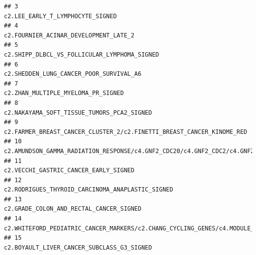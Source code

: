 \documentclass{article}\usepackage[]{graphicx}\usepackage[]{color}
\makeatletter
\newenvironment{kframe}{%
 \def\at@end@of@kframe{}%
 \ifinner\ifhmode%
  \def\at@end@of@kframe{\end{minipage}}%
  \begin{minipage}{\columnwidth}%
 \fi\fi%
 \def\FrameCommand##1{\hskip\@totalleftmargin \hskip-\fboxsep
 \colorbox{shadecolor}{##1}\hskip-\fboxsep
     \hskip-\linewidth \hskip-\@totalleftmargin \hskip\columnwidth}%
 \MakeFramed {\advance\hsize-\width
   \@totalleftmargin\z@ \linewidth\hsize
   \@setminipage}}%
 {\par\unskip\endMakeFramed%
 \at@end@of@kframe}
\newenvironment{knitrout}{}{} %
\makeatother
\begin{document}
\begin{knitrout}
\begin{kframe}
\begin{verbatim}
## 3                                                                                                                                                                                   c2.LEE_EARLY_T_LYMPHOCYTE_SIGNED
## 4                                                                                                                                                                              c2.FOURNIER_ACINAR_DEVELOPMENT_LATE_2
## 5                                                                                                                                                                       c2.SHIPP_DLBCL_VS_FOLLICULAR_LYMPHOMA_SIGNED
## 6                                                                                                                                                                            c2.SHEDDEN_LUNG_CANCER_POOR_SURVIVAL_A6
## 7                                                                                                                                                                                 c2.ZHAN_MULTIPLE_MYELOMA_PR_SIGNED
## 8                                                                                                                                                                         c2.NAKAYAMA_SOFT_TISSUE_TUMORS_PCA2_SIGNED
## 9                                                                                                                                              c2.FARMER_BREAST_CANCER_CLUSTER_2/c2.FINETTI_BREAST_CANCER_KINOME_RED
## 10                                                  c2.AMUNDSON_GAMMA_RADIATION_RESPONSE/c4.GNF2_CDC20/c4.GNF2_CDC2/c4.GNF2_CENPE/c4.GNF2_CENPF/c4.GNF2_CCNA2/c4.GNF2_CCNB2/c4.GNF2_H2AFX/c4.GNF2_HMMR/c4.GNF2_MKI67
## 11                                                                                                                                                                             c2.VECCHI_GASTRIC_CANCER_EARLY_SIGNED
## 12                                                                                                                                                                  c2.RODRIGUES_THYROID_CARCINOMA_ANAPLASTIC_SIGNED
## 13                                                                                                                                                                           c2.GRADE_COLON_AND_RECTAL_CANCER_SIGNED
## 14                                                                                                                            c2.WHITEFORD_PEDIATRIC_CANCER_MARKERS/c2.CHANG_CYCLING_GENES/c4.MODULE_54/c4.MODULE_57
## 15                                                                                                                                                                        c2.BOYAULT_LIVER_CANCER_SUBCLASS_G3_SIGNED

\end{verbatim}
\end{kframe}
\end{knitrout}
\end{document}
